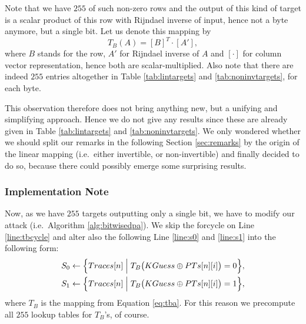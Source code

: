 Note that we have $255$ of such non-zero rows and the output of this kind of target is a scalar product of this row with Rijndael inverse of input, hence not a byte anymore, but a single bit. Let us denote this mapping by
\begin{equation}
\label{eq:tba}
	T_B(A) = [B]^T\cdot [A'] ,
\end{equation}
where $B$ stands for the row, $A'$ for Rijndael inverse of $A$ and $[\cdot]$ for column vector representation, hence both are scalar-multiplied. Also note that there are indeed $255$ entries altogether in Table \ref{tab:lintargets} and \ref{tab:noninvtargets}, for each byte.

This observation therefore does not bring anything new, but a unifying and simplifying approach. Hence we do not give any results since these are already given in Table \ref{tab:lintargets} and \ref{tab:noninvtargets}. We only wondered whether we should split our remarks in the following Section \ref{sec:remarks} by the origin of the linear mapping (i.e.\ either invertible, or non-invertible) and finally decided to do so, because there could possibly emerge some surprising results.

\subsubsection{Implementation Note}
	
	Now, as we have $255$ targets outputting only a single bit, we have to modify our attack (i.e.\ Algorithm \ref{alg:bitwisedpa}). We skip the forcycle on Line \ref{line:tbcycle} and alter also the following Line \ref{line:s0} and \ref{line:s1} into the following form:
	\begin{align*}
		S_0 &\gets \Bigl\{ Traces[n] \Bigm| T_B\bigl(KGuess\oplus PTs[n][i]\bigr) = 0 \Bigr\} , \\
		S_1 &\gets \Bigl\{ Traces[n] \Bigm| T_B\bigl(KGuess\oplus PTs[n][i]\bigr) = 1 \Bigr\} ,
	\end{align*}
	where $T_B$ is the mapping from Equation \ref{eq:tba}. For this reason we precompute all $255$ lookup tables for $T_B$'s, of course.
	



